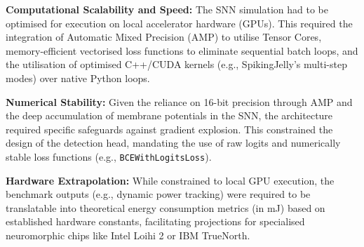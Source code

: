 \begin{itemize}
    \begin{sloppypar}
    \item \textbf{Computational Scalability and Speed:} The SNN simulation had to be optimised for execution on local accelerator hardware (GPUs). This required the integration of Automatic Mixed Precision (AMP) to utilise Tensor Cores, memory-efficient vectorised loss functions to eliminate sequential batch loops, and the utilisation of optimised C++/CUDA kernels (e.g., SpikingJelly's multi-step modes) over native Python loops.
    \end{sloppypar}

    \begin{sloppypar}
    \item \textbf{Numerical Stability:} Given the reliance on 16-bit precision through AMP and the deep accumulation of membrane potentials in the SNN, the architecture required specific safeguards against gradient explosion. This constrained the design of the detection head, mandating the use of raw logits and numerically stable loss functions (e.g., \texttt{BCEWithLogitsLoss}).
    \end{sloppypar}
    
    \begin{sloppypar}
    \item \textbf{Hardware Extrapolation:} While constrained to local GPU execution, the benchmark outputs (e.g., dynamic power tracking) were required to be translatable into theoretical energy consumption metrics (in mJ) based on established hardware constants, facilitating projections for specialised neuromorphic chips like Intel Loihi 2 or IBM TrueNorth.
    \end{sloppypar}
\end{itemize}